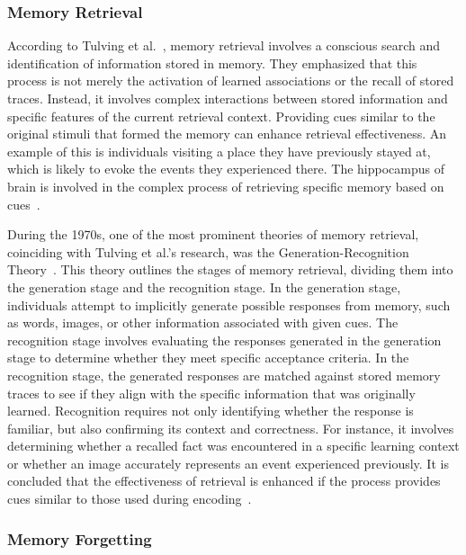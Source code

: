 \documentclass[journal,hideappendix]{vgtc}
\begin{document}
\subsubsection{Memory Retrieval}
\label{sec:human_memory:processing:retrieval}

According to Tulving et al.~\cite{tulving1973encoding}, memory retrieval involves a conscious search and identification of information stored in memory. They emphasized that this process is not merely the activation of learned associations or the recall of stored traces. Instead, it involves complex interactions between stored information and specific features of the current retrieval context. Providing cues similar to the original stimuli that formed the memory can enhance retrieval effectiveness. An example of this is individuals visiting a place they have previously stayed at, which is likely to evoke the events they experienced there. The hippocampus of brain is involved in the complex process of retrieving specific memory based on cues~\cite{marr1991simple,o2014complementary}.

During the 1970s, one of the most prominent theories of memory retrieval, coinciding with Tulving et al.'s research, was the Generation-Recognition Theory~\cite{shiffrin1969memory,underwood1969memory,tulving1973encoding}. 
This theory outlines the stages of memory retrieval, dividing them into the generation stage and the recognition stage. 
In the generation stage, individuals attempt to implicitly generate possible responses from memory, such as words, images, or other information associated with given cues. 
The recognition stage involves evaluating the responses generated in the generation stage to determine whether they meet specific acceptance criteria. In the recognition stage, the generated responses are matched against stored memory traces to see if they align with the specific information that was originally learned. Recognition requires not only identifying whether the response is familiar, but also confirming its context and correctness. For instance, it involves determining whether a recalled fact was encountered in a specific learning context or whether an image accurately represents an event experienced previously. It is concluded that the effectiveness of retrieval is enhanced if the process provides cues similar to those used during encoding~\cite{tulving1973encoding,bower1972encoding}.

\subsubsection{Memory Forgetting}
\label{sec:human_memory:processing:forgetting}
\end{document}
